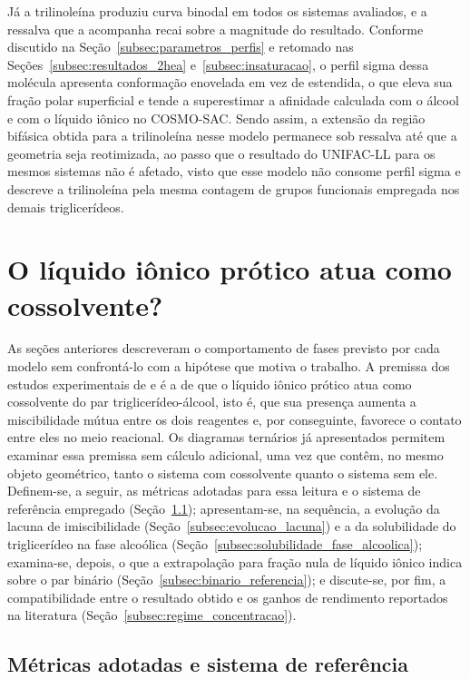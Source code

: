 Já a trilinoleína produziu curva binodal em todos os sistemas avaliados, e a ressalva que a acompanha recai sobre a magnitude do resultado. Conforme discutido na Seção~\ref{subsec:parametros_perfis} e retomado nas Seções~\ref{subsec:resultados_2hea} e~\ref{subsec:insaturacao}, o perfil sigma dessa molécula apresenta conformação enovelada em vez de estendida, o que eleva sua fração polar superficial e tende a superestimar a afinidade calculada com o álcool e com o líquido iônico no COSMO-SAC. Sendo assim, a extensão da região bifásica obtida para a trilinoleína nesse modelo permanece sob ressalva até que a geometria seja reotimizada, ao passo que o resultado do UNIFAC-LL para os mesmos sistemas não é afetado, visto que esse modelo não consome perfil sigma e descreve a trilinoleína pela mesma contagem de grupos funcionais empregada nos demais triglicerídeos.

\section{O líquido iônico prótico atua como cossolvente?}
\label{sec:cossolvencia}

As seções anteriores descreveram o comportamento de fases previsto por cada modelo sem confrontá-lo com a hipótese que motiva o trabalho. A premissa dos estudos experimentais de  e  é a de que o líquido iônico prótico atua como cossolvente do par triglicerídeo-álcool, isto é, que sua presença aumenta a miscibilidade mútua entre os dois reagentes e, por conseguinte, favorece o contato entre eles no meio reacional. Os diagramas ternários já apresentados permitem examinar essa premissa sem cálculo adicional, uma vez que contêm, no mesmo objeto geométrico, tanto o sistema com cossolvente quanto o sistema sem ele. Definem-se, a seguir, as métricas adotadas para essa leitura e o sistema de referência empregado (Seção~\ref{subsec:metrica_lacuna}); apresentam-se, na sequência, a evolução da lacuna de imiscibilidade (Seção~\ref{subsec:evolucao_lacuna}) e a da solubilidade do triglicerídeo na fase alcoólica (Seção~\ref{subsec:solubilidade_fase_alcoolica}); examina-se, depois, o que a extrapolação para fração nula de líquido iônico indica sobre o par binário (Seção~\ref{subsec:binario_referencia}); e discute-se, por fim, a compatibilidade entre o resultado obtido e os ganhos de rendimento reportados na literatura (Seção~\ref{subsec:regime_concentracao}).

\subsection{Métricas adotadas e sistema de referência}
\label{subsec:metrica_lacuna}

